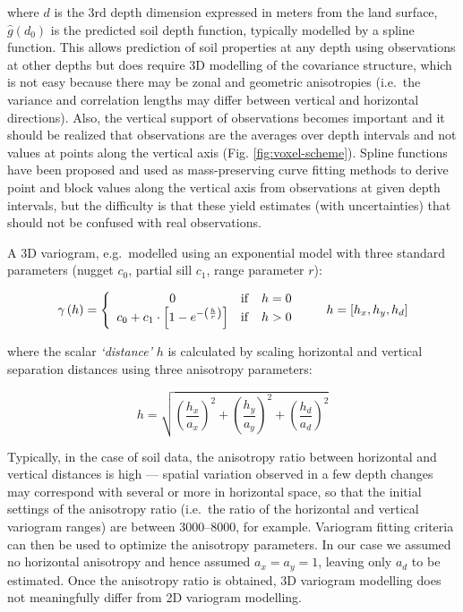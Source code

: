 \documentclass[graybox,natbib,nospthms,UStrade]{svmono}
\begin{document}
where \(d\) is the 3rd depth dimension expressed in meters from the land
surface, \({{\hat g}}(d_0)\) is the predicted soil depth function,
typically modelled by a spline function. This allows prediction of soil
properties at any depth using observations at other depths but does
require 3D modelling of the covariance structure, which is not easy
because there may be zonal and geometric anisotropies (i.e.~the variance
and correlation lengths may differ between vertical and horizontal
directions). Also, the vertical support of observations becomes
important and it should be realized that observations are the averages
over depth intervals and not values at points along the vertical axis
(Fig. \ref{fig:voxel-scheme}). Spline functions have been proposed and
used as mass-preserving curve fitting methods to derive point and block
values along the vertical axis from observations at given depth
intervals, but the difficulty is that these yield estimates (with
uncertainties) that should not be confused with real observations.

A 3D variogram, e.g.~modelled using an exponential model with three
standard parameters (nugget \(c_0\), partial sill \(c_1\), range parameter
\(r\)):

\begin{equation}
\gamma \left( {{h}} \right) = \left\{
{\begin{array}{*{20}c}
   0 & {{\rm{if}}} & {h = 0}  \\
   {c_0  + c_1  \cdot \left[ {1 - e^{ - \left( {\frac{{h}}
{r}} \right)} } \right]} & {{\rm{if}}} & {h > 0}  \\
 \end{array} } \right. \qquad {{h}} =  \left[ {h_x  , h_y  , h_d } \right]
\label{eq:exp}
\end{equation}

where the scalar \emph{`distance'} \(h\) is calculated by scaling horizontal
and vertical separation distances using three anisotropy parameters:

\begin{equation}
h = \sqrt {\left( {\frac{{h_x  }}{{a_x  }}} \right)^2  + \left( {\frac{{h_y  }}{{a_y  }}} \right)^2  + \left( {\frac{{h_d }}{{a_d }}} \right)^2 }
\label{eq:anisotropy}
\end{equation}

Typically, in the case of soil data, the anisotropy ratio between
horizontal and vertical distances is high --- spatial variation observed
in a few depth changes may correspond with several or more in horizontal
space, so that the initial settings of the anisotropy ratio (i.e.~the
ratio of the horizontal and vertical variogram ranges) are between
3000--8000, for example. Variogram fitting criteria can then be used to
optimize the anisotropy parameters. In our case we assumed no horizontal
anisotropy and hence assumed \(a_x=a_y=1\), leaving only \(a_d\) to be
estimated. Once the anisotropy ratio is obtained, 3D variogram modelling
does not meaningfully differ from 2D variogram modelling.
\end{document}
